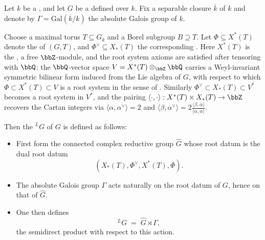 \begin{definition} \label{definition:langlands_dual_group_of_a_connected_reductive_algebraic_group_over_a_field_with_respect_to_a_maximal_torus_and_a_root_system}
Let $k$ be a , and let $G$ be a   defined over $k$.
Fix a separable closure $\overline{k}$ of $k$ and denote by $\Gamma = \mathrm{Gal}(\overline{k}/k)$ the absolute Galois group of $k$.

Choose a maximal torus $T \subseteq G_{\overline{k}}$ and a Borel subgroup $B \supseteq T$.
Let $\Phi \subseteq X^\ast(T)$ denote the  of $(G,T)$, and $\Phi^\vee \subseteq X_\ast(T)$ the corresponding .  Here $X^\ast(T)$ is the , a free $\bbZ$-module, and the root system axioms are satisfied after tensoring with $\bbQ$: the $\bbQ$-vector space $V = X^\ast(T) \otimes_{\bbZ} \bbQ$ carries a Weyl-invariant symmetric bilinear form induced from the Lie algebra of $G$, with respect to which $\Phi \subset X^\ast(T) \subset V$ is a root system in the sense of .  Similarly $\Phi^\vee \subset X_\ast(T) \subset V^\ast$ becomes a root system in $V^\ast$, and the pairing $\langle\cdot,\cdot\rangle: X^\ast(T) \times X_\ast(T) \to \bbZ$ recovers the Cartan integers via $\langle\alpha,\alpha^\vee\rangle = 2$ and $\langle\beta,\alpha^\vee\rangle = 2\frac{\langle\beta,\alpha\rangle}{\langle\alpha,\alpha\rangle}$.

Then the  ${}^LG$ of $G$ is defined as follows:
\begin{itemize}
  \item First form the connected complex reductive group $\widehat{G}$ whose root datum is the dual root datum
  $$(X_\ast(T), \Phi^\vee, X^\ast(T), \Phi).$$
  \item The absolute Galois group $\Gamma$ acts naturally on the root datum of $G$, hence on that of $\widehat{G}$.
  \item One then defines
  $${}^LG \;=\; \widehat{G} \rtimes \Gamma,$$
  the semidirect product with respect to this action.
\end{itemize}
\end{definition}